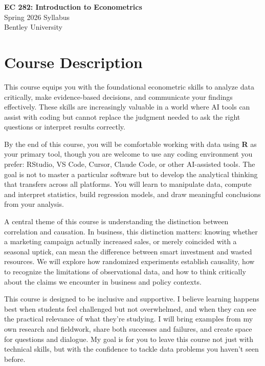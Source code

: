 \documentclass[11pt,letterpaper]{article}
\begin{document}
\begin{center}
{\LARGE\bfseries\color{bentleyblue} EC 282: Introduction to Econometrics}\\[0.3cm]
{\Large Spring 2026 Syllabus}\\[0.5cm]
{\large Bentley University}
\end{center}

\vspace{0.5cm}

\section*{Course Description}

This course equips you with the foundational econometric skills to analyze data critically, make evidence-based decisions, and communicate your findings effectively. These skills are increasingly valuable in a world where AI tools can assist with coding but cannot replace the judgment needed to ask the right questions or interpret results correctly.

By the end of this course, you will be comfortable working with data using \textbf{R} as your primary tool, though you are welcome to use any coding environment you prefer: RStudio, VS Code, Cursor, Claude Code, or other AI-assisted tools. The goal is not to master a particular software but to develop the analytical thinking that transfers across all platforms. You will learn to manipulate data, compute and interpret statistics, build regression models, and draw meaningful conclusions from your analysis.

A central theme of this course is understanding the distinction between correlation and causation. In business, this distinction matters: knowing whether a marketing campaign actually increased sales, or merely coincided with a seasonal uptick, can mean the difference between smart investment and wasted resources. We will explore how randomized experiments establish causality, how to recognize the limitations of observational data, and how to think critically about the claims we encounter in business and policy contexts.

This course is designed to be inclusive and supportive. I believe learning happens best when students feel challenged but not overwhelmed, and when they can see the practical relevance of what they're studying. I will bring examples from my own research and fieldwork, share both successes and failures, and create space for questions and dialogue. My goal is for you to leave this course not just with technical skills, but with the confidence to tackle data problems you haven't seen before.
\end{document}
